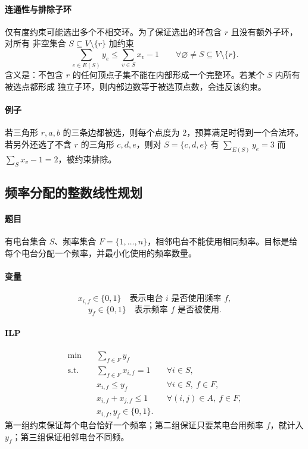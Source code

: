 \documentclass[UTF8,openany,12pt]{ctexbook}
\theoremstyle{remark}
\begin{document}
\paragraph{连通性与排除子环}
仅有度约束可能选出多个不相交环。为了保证选出的环包含 $r$ 且没有额外子环，对所有
非空集合 $S\subseteq V\setminus\{r\}$ 加约束
\[
  \sum_{e\in E(S)}y_e\le \sum_{v\in S}x_v-1
  \qquad \forall \varnothing\ne S\subseteq V\setminus\{r\}.
\]
含义是：不包含 $r$ 的任何顶点子集不能在内部形成一个完整环。若某个 $S$ 内所有被选点都形成
独立子环，则内部边数等于被选顶点数，会违反该约束。

\paragraph{例子}
若三角形 $r,a,b$ 的三条边都被选，则每个点度为 $2$，预算满足时得到一个合法环。
若另外还选了不含 $r$ 的三角形 $c,d,e$，则对 $S=\{c,d,e\}$ 有
$\sum_{E(S)}y_e=3$ 而 $\sum_{S}x_v-1=2$，被约束排除。

\subsection{频率分配的整数线性规划}

\paragraph{题目}
有电台集合 $S$、频率集合 $F=\{1,\dots,n\}$，相邻电台不能使用相同频率。目标是给每个电台分配一个频率，并最小化使用的频率数量。

\paragraph{变量}
\[
  x_{i,f}\in\{0,1\}\quad \text{表示电台 }i\text{ 是否使用频率 }f,
\]
\[
  y_f\in\{0,1\}\quad \text{表示频率 }f\text{ 是否被使用}.
\]

\paragraph{ILP}
\[
\begin{aligned}
  \min\quad &\sum_{f\in F}y_f\\
  \text{s.t.}\quad
  &\sum_{f\in F}x_{i,f}=1 &&\forall i\in S,\\
  &x_{i,f}\le y_f &&\forall i\in S,\ f\in F,\\
  &x_{i,f}+x_{j,f}\le 1 &&\forall (i,j)\in A,\ f\in F,\\
  &x_{i,f},y_f\in\{0,1\}.
\end{aligned}
\]
第一组约束保证每个电台恰好一个频率；第二组保证只要某电台用频率 $f$，就计入
$y_f$；第三组保证相邻电台不同频。
\end{document}
